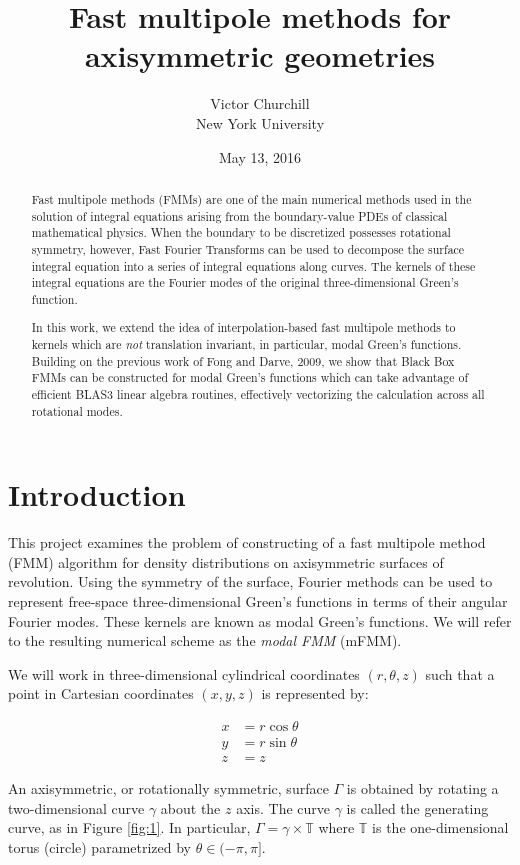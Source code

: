 \documentclass[11pt, oneside]{article}   	%
\title{Fast multipole methods for axisymmetric geometries}
\author{Victor Churchill\\New York University}
\date{May 13, 2016}
\begin{document}
\maketitle

\begin{abstract}
Fast multipole methods (FMMs) are one of the main numerical methods used in the solution of integral equations arising from the boundary-value PDEs of classical mathematical physics. When the boundary to be discretized possesses rotational symmetry, however, Fast Fourier Transforms can be used to decompose the surface integral equation into a series of integral equations along curves. The kernels of these integral equations are the Fourier modes of the original three-dimensional Green's function.

In this work, we extend the idea of interpolation-based fast multipole methods to kernels which are \textit{not} translation invariant, in particular, modal Green's functions. Building on the previous work of Fong and Darve, 2009, we show that Black Box FMMs can be constructed for modal Green's functions which can take advantage of efficient BLAS3 linear algebra routines, effectively vectorizing the calculation across all rotational modes.
\end{abstract}

\section{Introduction}
This project examines the problem of constructing of a fast multipole method (FMM) algorithm for density distributions on axisymmetric surfaces of revolution. Using the symmetry of the surface, Fourier methods can be used to represent free-space three-dimensional Green's functions in terms of their angular Fourier modes. These kernels are known as modal Green's functions. We will refer to the resulting numerical scheme as the \textit{modal FMM} (mFMM).

We will work in three-dimensional cylindrical coordinates $(r,\theta,z)$ such that a point in Cartesian coordinates $(x,y,z)$ is represented by:

\begin{align*}
x &= r\cos\theta\\
y &= r\sin\theta\\
z &= z
\end{align*}

An axisymmetric, or rotationally symmetric, surface $\Gamma$ is obtained by rotating a two-dimensional curve $\gamma$ about the $z$ axis. The curve $\gamma$ is called the generating curve, as in Figure \ref{fig:1}. In particular, $\Gamma=\gamma\times\mathbb{T}$ where $\mathbb{T}$ is the one-dimensional torus (circle) parametrized by $\theta\in(-\pi,\pi]$.
\end{document}
